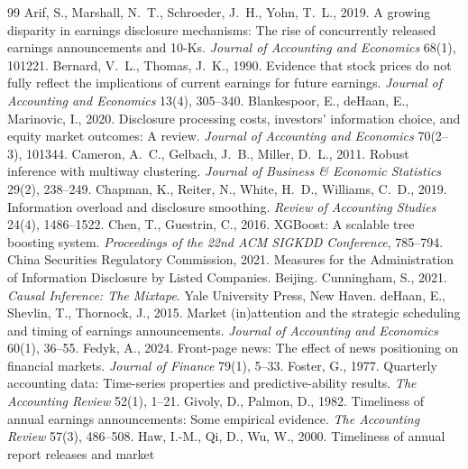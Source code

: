 \documentclass[11pt]{article}
\begin{document}
\small
\begin{thebibliography}{99}
 Arif, S., Marshall, N.~T., Schroeder, J.~H., Yohn, T.~L., 2019. A growing
disparity in earnings disclosure mechanisms: The rise of concurrently released earnings announcements and 10-Ks.
\emph{Journal of Accounting and Economics} 68(1), 101221.
 Bernard, V.~L., Thomas, J.~K., 1990. Evidence that stock prices do not
fully reflect the implications of current earnings for future earnings. \emph{Journal of Accounting and Economics}
13(4), 305--340.
 Blankespoor, E., deHaan, E., Marinovic, I., 2020. Disclosure
processing costs, investors' information choice, and equity market outcomes: A review. \emph{Journal of Accounting and
Economics} 70(2--3), 101344.
 Cameron, A.~C., Gelbach, J.~B., Miller, D.~L., 2011. Robust inference with
multiway clustering. \emph{Journal of Business \& Economic Statistics} 29(2), 238--249.
 Chapman, K., Reiter, N., White, H.~D., Williams, C.~D., 2019. Information
overload and disclosure smoothing. \emph{Review of Accounting Studies} 24(4), 1486--1522.
 Chen, T., Guestrin, C., 2016. XGBoost: A scalable tree boosting system.
\emph{Proceedings of the 22nd ACM SIGKDD Conference}, 785--794.
 China Securities Regulatory Commission, 2021. Measures for the Administration of
Information Disclosure by Listed Companies. Beijing.
 Cunningham, S., 2021. \emph{Causal Inference: The Mixtape}. Yale University
Press, New Haven.
 deHaan, E., Shevlin, T., Thornock, J., 2015. Market (in)attention and the
strategic scheduling and timing of earnings announcements. \emph{Journal of Accounting and Economics} 60(1), 36--55.
 Fedyk, A., 2024. Front-page news: The effect of news positioning on financial markets.
\emph{Journal of Finance} 79(1), 5--33.
 Foster, G., 1977. Quarterly accounting data: Time-series properties and
predictive-ability results. \emph{The Accounting Review} 52(1), 1--21.
 Givoly, D., Palmon, D., 1982. Timeliness of annual earnings
announcements: Some empirical evidence. \emph{The Accounting Review} 57(3), 486--508.
 Haw, I.-M., Qi, D., Wu, W., 2000. Timeliness of annual report releases and market

\end{thebibliography}
\end{document}

